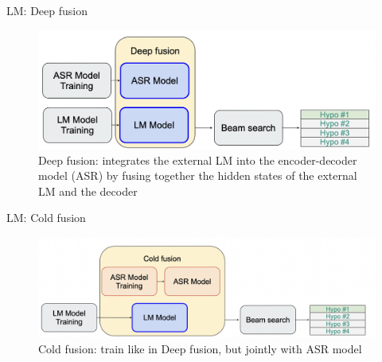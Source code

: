 \begin{frame}{LM: Deep fusion}
    \begin{figure}
    	\centering
    	\includegraphics[width=0.99\linewidth]{figs/lm_deep_fusion.png}
    	\caption{Deep fusion: integrates the external LM into the encoder-decoder model (ASR) by fusing together the hidden states of the external LM and the decoder}
    \end{figure}
    

\end{frame}
\begin{frame}{LM: Cold fusion}
    \begin{figure}
    	\centering
    	\includegraphics[width=0.99\linewidth]{figs/lm_cold_fusion.png}
    	\caption{Cold fusion: train like in Deep fusion, but jointly with ASR model}
    \end{figure}

    \end{frame}
